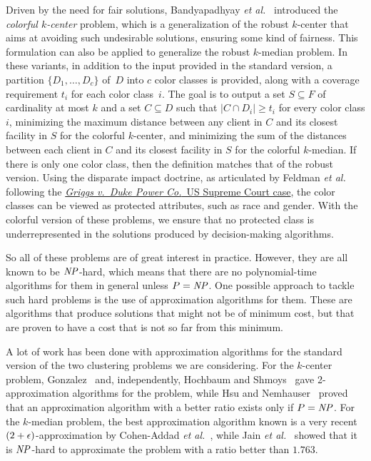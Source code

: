 Driven by the need for fair solutions, Bandyapadhyay \emph{et al.}~\cite{BIPV2019} introduced the \emph{colorful $k$-center} problem, which is a generalization of the robust $k$-center that aims at avoiding such undesirable solutions, ensuring some kind of fairness. This formulation can also be applied to generalize the robust $k$-median problem. 
In these variants, in addition to the input provided in the standard version, a partition $\{D_1,\ldots, D_c\}$ of~$D$ into $c$ color classes is provided, along with a coverage requirement $t_i$ for each color class~$i$. 
The goal is to output a set $S \subseteq F$ of cardinality at most $k$ and a set $C \subseteq D$ such that $|C \cap D_i| \geq t_i$ for every color class $i$, minimizing the maximum distance between any client in $C$ and its closest facility in $S$ for the colorful $k$-center, and minimizing the sum of the distances between each client in $C$ and its closest facility in $S$ for the colorful $k$-median.
If there is only one color class, then the definition matches that of the robust version.
Using the disparate impact doctrine, as articulated by Feldman \emph{et al.}~\cite{FSMSV2015} following the \href{https://en.wikipedia.org/wiki/Griggs_v._Duke_Power_Co.}{\emph{Griggs v.\ Duke Power Co.}\ US Supreme Court case}, the color classes can be viewed as protected attributes, such as race and gender. 
With the colorful version of these problems, we ensure that no protected class is underrepresented in the solutions produced by decision-making algorithms.


So all of these problems are of great interest in practice. However, they are all known to be $\mathit{NP}$-hard, which means that there are no polynomial-time algorithms for them in general unless $P=\mathit{NP}$.  One possible approach to tackle such hard problems is the use of approximation algorithms for them.  These are algorithms that produce solutions that might not be of minimum cost, but that are proven to have a cost that is not so far from this minimum. 

A lot of work has been done with approximation algorithms for the standard version of the two clustering problems we are considering.
For the $k$-center problem, Gonzalez~\cite{G1985} and, independently, Hochbaum and Shmoys~\cite{HS1985} gave 2-approximation algorithms for the problem, while Hsu and Nemhauser~\cite{HN1979} proved that an approximation algorithm with a better ratio exists only if $P=\mathit{NP}$. 
For the $k$-median problem, the best approximation algorithm known is a very recent $(2 + \epsilon)$-approximation by Cohen-Addad \emph{et al.}~\cite{CGLS2025}, while Jain \emph{et al.}~\cite{JMS2002} showed that it is $\mathit{NP}$-hard to approximate the problem with a ratio better than $1.763$.

